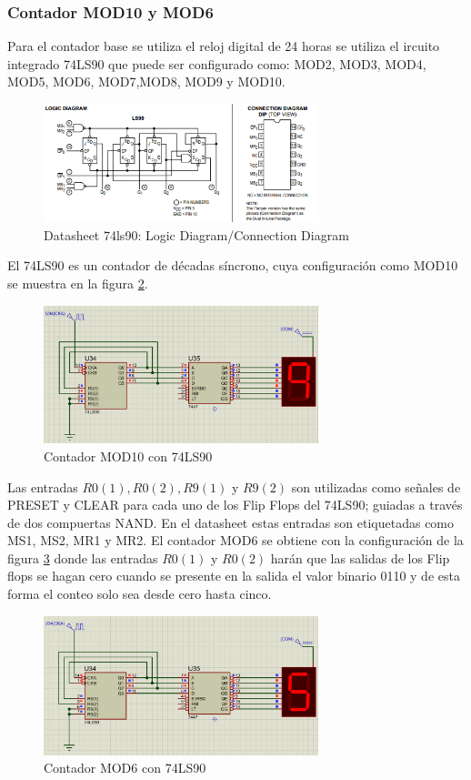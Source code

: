 \documentclass[journal]{IEEEtran}
\begin{document}
\subsubsection{Contador MOD10 y MOD6}
Para el contador base se utiliza el reloj digital de 24 horas se utiliza el ircuito integrado 74LS90 que puede ser configurado como: MOD2, MOD3, MOD4, MOD5, MOD6, MOD7,MOD8, MOD9 y MOD10.
\begin{figure}[htb]
    \centering
    \includegraphics[width=8cm]{images/image2.png}
    \caption{Datasheet 74ls90: Logic Diagram/Connection Diagram}
    \label{datasheet_diagram}
\end{figure}
El 74LS90 es un contador de décadas síncrono, cuya configuración como MOD10 se muestra en la figura \ref{cont_MOD10}.
\begin{figure}[htb]
    \centering
    \includegraphics[width=8cm]{images/image4.png}
    \caption{Contador MOD10 con 74LS90}
    \label{cont_MOD10}
\end{figure}
Las  entradas  $R0(1),  R0(2),  R9(1)$ y $R9(2)$  son  utilizadas  como  señales  de  PRESET  y CLEAR para cada uno de los Flip Flops del 74LS90; guiadas a través de dos compuertas NAND. En el datasheet estas entradas son etiquetadas como MS1, MS2, MR1 y MR2. 
\newline
El contador MOD6 se obtiene con la configuración de la figura \ref{cont_MOD6} donde las entradas $R0(1)$ y $R0(2)$ harán que las salidas de los Flip flops se hagan cero cuando se presente en la salida el valor binario 0110 y de esta forma el conteo solo sea desde cero hasta cinco.
\begin{figure}[htb]
    \centering
    \includegraphics[width=8cm]{images/image5.png}
    \caption{Contador MOD6 con 74LS90}
    \label{cont_MOD6}
\end{figure}
\end{document}
